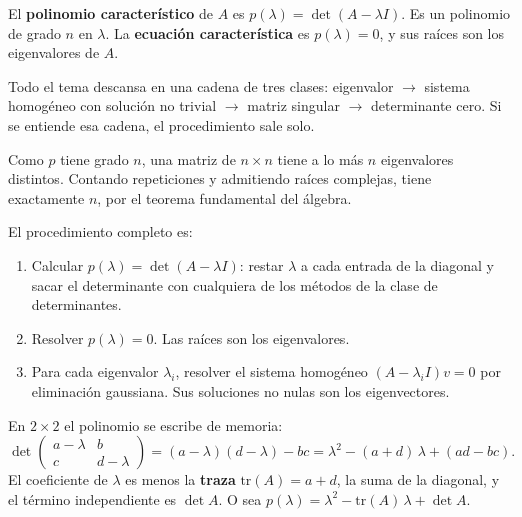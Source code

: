 \documentclass[11pt,letterpaper]{article}
\begin{document}
\begin{definicion}
    El \textbf{polinomio característico} de $A$ es
    $p(\lambda) = \det(A - \lambda I)$. Es un polinomio de grado $n$
    en $\lambda$. La \textbf{ecuación característica} es
    $p(\lambda) = 0$, y sus raíces son los eigenvalores de $A$.
\end{definicion}

\begin{idea}
    Todo el tema descansa en una cadena de tres clases: eigenvalor
    $\to$ sistema homogéneo con solución no trivial $\to$ matriz
    singular $\to$ determinante cero. Si se entiende esa cadena, el
    procedimiento sale solo.
\end{idea}

Como $p$ tiene grado $n$, una matriz de $n \times n$ tiene a lo más
$n$ eigenvalores distintos. Contando repeticiones y admitiendo raíces
complejas, tiene exactamente $n$, por el teorema fundamental del
álgebra.

El procedimiento completo es:
\begin{enumerate}[itemsep=0.2em]
    \item Calcular $p(\lambda) = \det(A - \lambda I)$: restar
          $\lambda$ a cada entrada de la diagonal y sacar el
          determinante con cualquiera de los métodos de la clase de
          determinantes.
    \item Resolver $p(\lambda) = 0$. Las raíces son los eigenvalores.
    \item Para cada eigenvalor $\lambda_i$, resolver el sistema
          homogéneo $(A - \lambda_i I)v = 0$ por eliminación
          gaussiana. Sus soluciones no nulas son los eigenvectores.
\end{enumerate}

\begin{idea}
    En $2 \times 2$ el polinomio se escribe de memoria:
    \[
        \det\begin{pmatrix} a - \lambda & b \\ c & d - \lambda
        \end{pmatrix}
        = (a - \lambda)(d - \lambda) - bc
        = \lambda^2 - (a + d)\,\lambda + (ad - bc) .
    \]
    El coeficiente de $\lambda$ es menos la \textbf{traza}
    $\mathrm{tr}(A) = a + d$, la suma de la diagonal, y el término
    independiente es $\det A$. O sea
    $p(\lambda) = \lambda^2 - \mathrm{tr}(A)\,\lambda + \det A$.
\end{idea}
\end{document}
